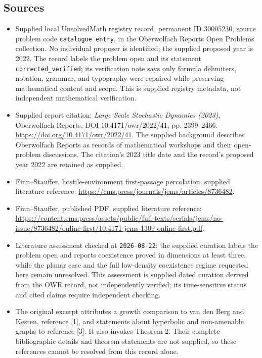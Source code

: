 \documentclass[11pt]{article}
\begin{document}
\subsection{Sources}
\begin{itemize}
\item Supplied local UnsolvedMath registry record, permanent ID \(30005230\), source problem code \texttt{catalogue entry}, in the Oberwolfach Reports Open Problems collection. No individual proposer is identified; the supplied proposed year is 2022. The record labels the problem open and its statement \texttt{corrected\_verified}; its verification note says only formula delimiters, notation, grammar, and typography were repaired while preserving mathematical content and scope. This is supplied registry metadata, not independent mathematical verification.
\item Supplied report citation: \emph{Large Scale Stochastic Dynamics (2023)}, Oberwolfach Reports, DOI 10.4171/owr/2022/41, pp. 2399--2466. \url{https://doi.org/10.4171/owr/2022/41}. The supplied background describes Oberwolfach Reports as records of mathematical workshops and their open-problem discussions. The citation's 2023 title date and the record's proposed year 2022 are retained as supplied.
\item Finn--Stauffer, hostile-environment first-passage percolation, supplied literature reference: \url{https://ems.press/journals/jems/articles/8736482}.
\item Finn--Stauffer, published PDF, supplied literature reference: \url{https://content.ems.press/assets/public/full-texts/serials/jems/no-issue/8736482/online-first/10.4171-jems-1309-online-first.pdf}.
\item Literature assessment checked at \texttt{2026-08-22}: the supplied curation labels the problem open and reports coexistence proved in dimensions at least three, while the planar case and the full low-density coexistence regime requested here remain unresolved. This assessment is supplied dated curation derived from the OWR record, not independently verified; its time-sensitive status and cited claims require independent checking.
\item The original excerpt attributes a growth comparison to van den Berg and Kesten, reference [1], and statements about hyperbolic and non-amenable graphs to reference [3]. It also invokes Theorem 2. Their complete bibliographic details and theorem statements are not supplied, so these references cannot be resolved from this record alone.
\end{itemize}
\end{document}
